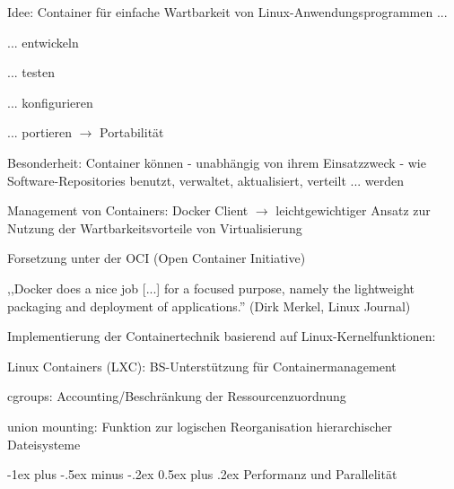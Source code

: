 \documentclass[a4paper]{article}
\makeatletter
\renewcommand{\section}{\@startsection{section}{1}{0mm}%
 {-1ex plus -.5ex minus -.2ex}%
 {0.5ex plus .2ex}%
 {\normalfont\large\bfseries}}
\makeatother
\begin{document}
\begin{multicols}{3}
    \begin{itemize*}
        \item
        Idee: Container für einfache Wartbarkeit von
        Linux-Anwendungsprogrammen ...
        \begin{itemize*}
            \item ... entwickeln
            \item ... testen
            \item ... konfigurieren
            \item ... portieren $\rightarrow$ Portabilität
        \end{itemize*}
        \item
        Besonderheit: Container können - unabhängig von ihrem Einsatzzweck -
        wie Software-Repositories benutzt, verwaltet, aktualisiert, verteilt
        ... werden
        \item
        Management von Containers: Docker Client $\rightarrow$
        leichtgewichtiger Ansatz zur Nutzung der Wartbarkeitsvorteile von
        Virtualisierung
        \item
        Forsetzung unter der OCI (Open Container Initiative)
        \begin{itemize*}
            \item ,,Docker does a nice job [...] for a focused purpose, namely the lightweight packaging and deployment of applications.'' (Dirk Merkel, Linux Journal)
        \end{itemize*}
        \item
        Implementierung der Containertechnik basierend auf
        Linux-Kernelfunktionen:
        \begin{itemize*}
            \item Linux Containers (LXC): BS-Unterstützung für Containermanagement
            \item cgroups: Accounting/Beschränkung der Ressourcenzuordnung
            \item union mounting: Funktion zur logischen Reorganisation hierarchischer Dateisysteme
        \end{itemize*}
    \end{itemize*}


    \section{Performanz und
      Parallelität}



\end{multicols}
\end{document}

